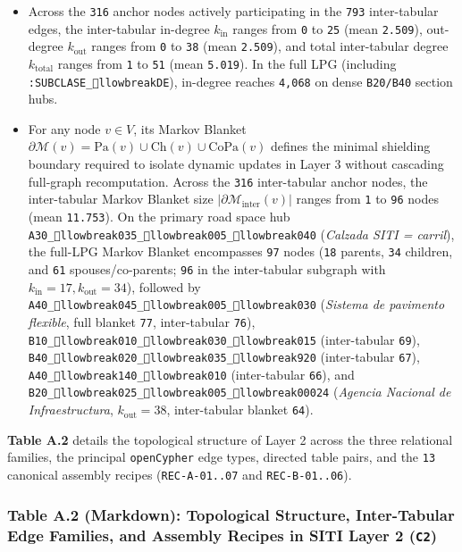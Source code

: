 \documentclass[10pt,a4paper]{article}
\begin{document}
\begin{itemize}
  \item Across the \texttt{316} anchor nodes actively participating in the \texttt{793} inter-tabular edges, the inter-tabular in-degree $k_{\text{in}}$ ranges from \texttt{0} to \texttt{25} (mean \texttt{2.509}), out-degree $k_{\text{out}}$ ranges from \texttt{0} to \texttt{38} (mean \texttt{2.509}), and total inter-tabular degree $k_{\text{total}}$ ranges from \texttt{1} to \texttt{51} (mean \texttt{5.019}). In the full LPG (including \texttt{:SUBCLASE\_llowbreak{}DE}), in-degree reaches \texttt{4,068} on dense \texttt{B20/B40} section hubs.
  \item For any node $v \in V$, its Markov Blanket $\partial\mathcal{M}(v) = \text{Pa}(v) \cup \text{Ch}(v) \cup \text{CoPa}(v)$ defines the minimal shielding boundary required to isolate dynamic updates in Layer 3 without cascading full-graph recomputation. Across the \texttt{316} inter-tabular anchor nodes, the inter-tabular Markov Blanket size $|\partial\mathcal{M}_{\text{inter}}(v)|$ ranges from \texttt{1} to \texttt{96} nodes (mean \texttt{11.753}). On the primary road space hub \texttt{A30\_llowbreak{}035\_llowbreak{}005\_llowbreak{}040} (\textit{Calzada SITI = carril}), the full-LPG Markov Blanket encompasses \texttt{97} nodes (\texttt{18} parents, \texttt{34} children, and \texttt{61} spouses/co-parents; \texttt{96} in the inter-tabular subgraph with $k_{\text{in}}=17, k_{\text{out}}=34$), followed by \texttt{A40\_llowbreak{}045\_llowbreak{}005\_llowbreak{}030} (\textit{Sistema de pavimento flexible}, full blanket \texttt{77}, inter-tabular \texttt{76}), \texttt{B10\_llowbreak{}010\_llowbreak{}030\_llowbreak{}015} (inter-tabular \texttt{69}), \texttt{B40\_llowbreak{}020\_llowbreak{}035\_llowbreak{}920} (inter-tabular \texttt{67}), \texttt{A40\_llowbreak{}140\_llowbreak{}010} (inter-tabular \texttt{66}), and \texttt{B20\_llowbreak{}025\_llowbreak{}005\_llowbreak{}00024} (\textit{Agencia Nacional de Infraestructura}, $k_{\text{out}}=38$, inter-tabular blanket \texttt{64}).
\end{itemize}

\textbf{Table A.2} details the topological structure of Layer 2 across the three relational families, the principal \texttt{openCypher} edge types, directed table pairs, and the \texttt{13} canonical assembly recipes (\texttt{REC-A-01..07} and \texttt{REC-B-01..06}).

\subsubsection*{Table A.2 (Markdown): Topological Structure, Inter-Tabular Edge Families, and Assembly Recipes in SITI Layer 2 (\texttt{C2})}
\end{document}
